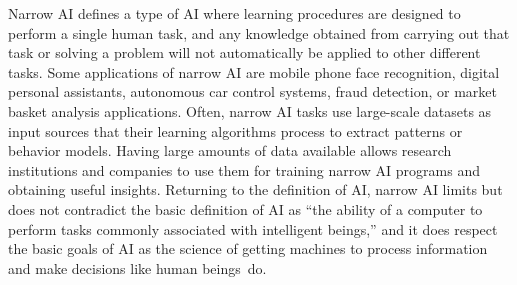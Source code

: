 Narrow AI defines a type of AI where learning procedures are designed to perform a single human task, and any knowledge obtained from carrying out that task or solving a problem will not automatically be applied to other different tasks. Some applications of narrow AI are mobile phone face recognition, digital personal assistants, autonomous car control systems, fraud detection, or market basket analysis applications. Often, narrow AI tasks use large-scale datasets as input sources that their learning algorithms process to extract patterns or behavior \hbox{models.} Having large amounts of data available allows research institutions and companies to use them for training narrow AI programs and obtaining useful insights. Returning to the definition of AI, narrow AI limits but does not contradict the basic definition of AI as ``the ability of a computer to perform tasks commonly associated with intelligent beings,'' and it does respect the basic goals of AI as the science of getting machines to process information and make decisions like human beings~do.

